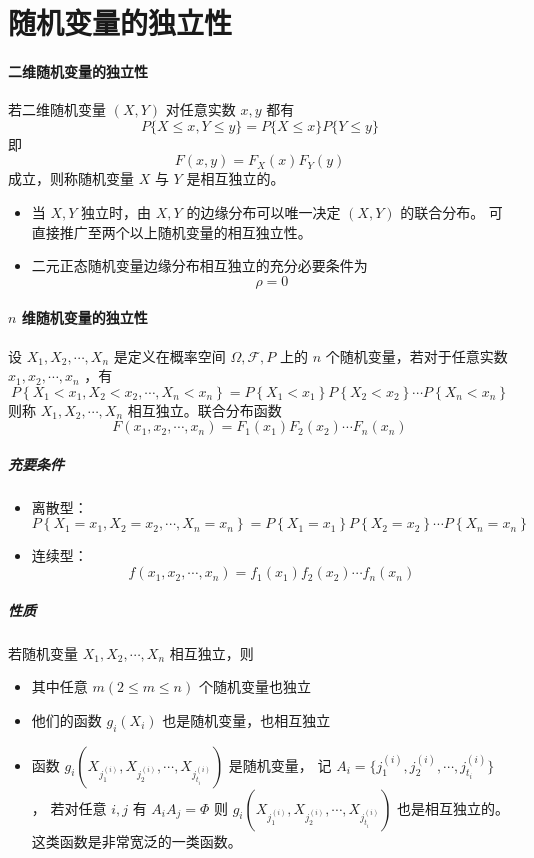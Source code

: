 \section{随机变量的独立性}

\paragraph{二维随机变量的独立性} 若二维随机变量 $ (X,Y) $ 对任意实数 $ x,y $ 都有
$$ P\{ X \leqslant x, Y \leqslant y \} = P\{ X \leqslant x \} P\{ Y \leqslant y \} $$
即 $$ F(x,y) = F_X(x)F_Y(y) $$
成立，则称随机变量 $ X $ 与 $ Y $ 是相互独立的。

\begin{itemize}[leftmargin=\paritemindent]
    \item 当 $ X,Y $ 独立时，由 $ X,Y $ 的边缘分布可以唯一决定 $ (X,Y) $ 的联合分布。
    可直接推广至两个以上随机变量的相互独立性。
    \item 二元正态随机变量边缘分布相互独立的充分必要条件为 $$ \rho = 0 $$
\end{itemize}

\paragraph{$ n $ 维随机变量的独立性} 设 $ X_{1}, X_{2}, \cdots, X_{n} $ 是定义在概率空间 $ \Omega, \mathcal{F}, P $
上的 $ n $ 个随机变量，若对于任意实数 $ x_{1}, x_{2}, \cdots, x_{n} $ ，有
$$ P\left\{ X_{1} < x_1, X_{2} < x_2, \cdots, X_{n} < x_n \right\} = 
P\left\{ X_{1} < x_1 \right\} P\left\{ X_{2} < x_2 \right\} \cdots P\left\{ X_{n} < x_n \right\} $$
则称 $ X_{1}, X_{2}, \cdots, X_{n} $ 相互独立。联合分布函数
$$ F(x_{1}, x_{2}, \cdots, x_{n}) = F_1(x_{1}) F_2(x_{2}) \cdots F_n(x_{n}) $$

\subparagraph{充要条件} 
\begin{itemize}[leftmargin=\subparitemindent]
    \item 离散型： $$ P\left\{ X_{1}=x_1, X_{2}=x_2, \cdots, X_{n}=x_n \right\} = 
    P\left\{ X_1 = x_1 \right\} P\left\{ X_2 = x_2 \right\} \cdots P\left\{ X_n = x_n \right\}  $$
    \item 连续型： $$ f(x_{1}, x_{2}, \cdots, x_{n}) = f_1(x_1) f_2(x_2) \cdots f_n(x_n) $$
\end{itemize}

\subparagraph{性质} 若随机变量 $ X_{1}, X_{2}, \cdots, X_{n} $ 相互独立，则
\begin{itemize}[leftmargin=\subparitemindent]
    \item 其中任意 $ m(2 \leqslant m \leqslant n) $ 个随机变量也独立
    \item 他们的函数 $ g_i(X_i) $ 也是随机变量，也相互独立
    \item 函数 $ g_i(X_{j_{1}^{(i)}}, X_{j_{2}^{(i)}}, \cdots, X_{j_{t_i}^{(i)}}) $ 是随机变量，
    记 $ A_i = \{j_{1}^{(i)}, j_{2}^{(i)}, \cdots, j_{t_i}^{(i)} \} $ ，
    若对任意 $ i,j $ 有 $ A_i A_j = \Phi $
    则 $ g_i(X_{j_{1}^{(i)}}, X_{j_{2}^{(i)}}, \cdots, X_{j_{t_i}^{(i)}}) $ 也是相互独立的。
    这类函数是非常宽泛的一类函数。
\end{itemize}
